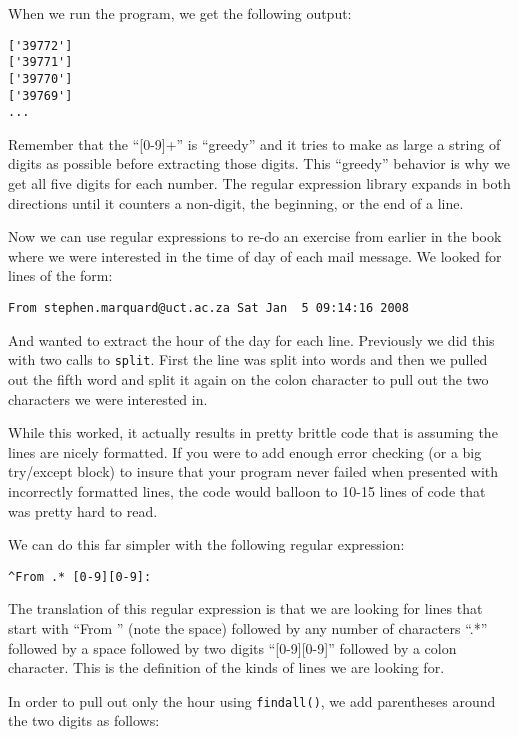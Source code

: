 When we run the program, we get the following output:

\beforeverb
\begin{verbatim}
['39772']
['39771']
['39770']
['39769']
...
\end{verbatim}
\afterverb
%
Remember that the ``[0-9]+'' is ``greedy'' and it tries to make as large a string of digits as possible before extracting those digits.  This ``greedy'' behavior is why we get all five digits for each number.  The regular expression library expands in both directions until it counters a non-digit, the beginning, or the end of a line.

Now we can use regular expressions to re-do an exercise from earlier in the book where we were interested in the time of day of each mail message.   We looked for lines of the form:

\beforeverb
\begin{verbatim}
From stephen.marquard@uct.ac.za Sat Jan  5 09:14:16 2008
\end{verbatim}
\afterverb
%
And wanted to extract the hour of the day for each line.  Previously we did this with two calls to {\tt split}.  First the line was split into words and then we pulled out the fifth word and split it again on the colon character to pull out the two characters we were interested in.

While this worked, it actually results in pretty brittle code that is assuming the lines are nicely formatted.  If you were to add enough error checking (or a big try/except block) to insure that your program never failed when presented with incorrectly formatted lines, the code would balloon to 10-15 lines of code that was pretty hard to read.

We can do this far simpler with the following regular expression:

\beforeverb
\begin{verbatim}
^From .* [0-9][0-9]:
\end{verbatim}
\afterverb
%
The translation of this regular expression is that we are looking for lines that start with ``From '' (note the space) followed by any number of characters ``.*'' followed by a space followed by two digits ``[0-9][0-9]'' followed by a colon character.  This is the definition of the kinds of lines we are looking for.  

In order to pull out only the hour using {\tt findall()}, we add parentheses around the two digits as follows:


